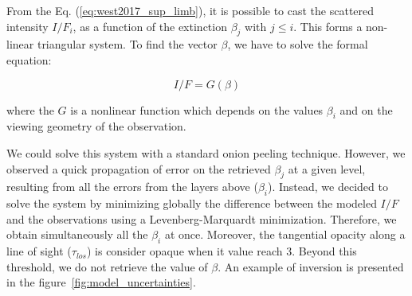 From the Eq. (\ref{eq:west2017_sup_limb}), it is possible to cast the scattered intensity $I/F_i$, as a function of
the extinction $\beta_j$ with $j \le i$. This forms a non-linear triangular system. To find the vector $\beta$, we
have to solve the formal equation:

\begin{equation}
    I/F = G(\beta)
\end{equation}

where the ${G}$ is a nonlinear function which depends on the values $\beta_i$ and on the viewing geometry of the observation.

We could solve this system with a standard onion peeling technique. However, we observed a quick propagation of error on
the retrieved $\beta_j$ at a given level, resulting from all the errors from the layers above ($\beta_i$).
Instead, we decided to solve the system by minimizing globally the difference between the modeled $I/F$ and the observations
using a Levenberg-Marquardt minimization. Therefore, we obtain simultaneously all the $\beta_i$ at once.
Moreover, the tangential opacity along a line of sight ($\tau_{los}$) is consider opaque when it value reach 3.
Beyond this threshold, we do not retrieve the value of $\beta$.
An example of inversion is presented in the figure~\ref{fig:model_uncertainties}.

